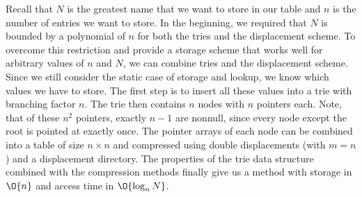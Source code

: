 Recall that $N$ is the greatest name that we want to store in our table and $n$ is the number of entries we want to store.
In the beginning, we required that $N$ is bounded by a polynomial of $n$ for both the tries and the displacement scheme.
To overcome this restriction and provide a storage scheme that works well for arbitrary values of $n$ and $N$, we can combine tries and the displacement scheme.
Since we still consider the static case of storage and lookup, we know which values we have to store.
The first step is to insert all these values into a trie with branching factor $n$.
The trie then contains $n$ nodes with $n$ pointers each.
Note, that of these $n^2$ pointers, exactly $n - 1$ are nonnull, since every node except the root is pointed at exactly once.
The pointer arrays of each node can be combined into a table of size $n \times n$ and compressed using double displacements (with $m = n$) and a displacement directory.
The properties of the trie data structure combined with the compression methods finally give us a method with storage in $\O{n}$ and access time in $\O{\log_n N}$.